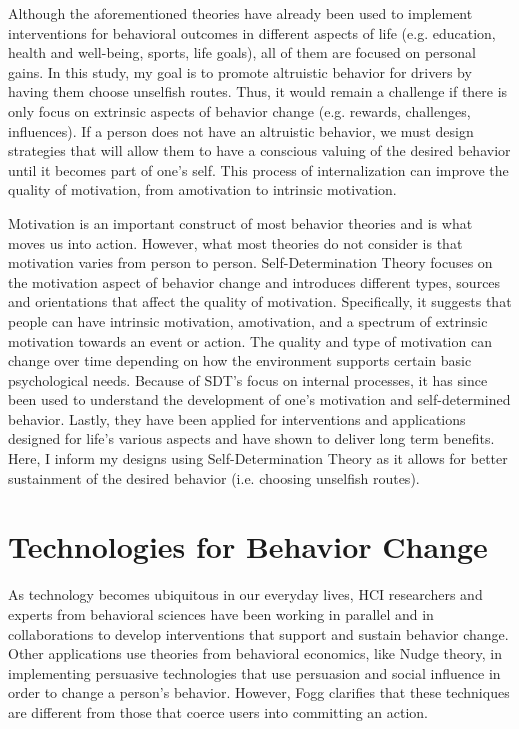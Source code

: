 Although the aforementioned theories have already been used to implement interventions for behavioral outcomes in different aspects of life (e.g. education, health and well-being, sports, life goals), all of them are focused on personal gains. In this study, my goal is to promote altruistic behavior for drivers by having them choose unselfish routes. Thus, it would remain a challenge if there is only focus on extrinsic aspects of behavior change (e.g. rewards, challenges, influences). If a person does not have an altruistic behavior, we must design strategies that will allow them to have a conscious valuing of the desired behavior until it becomes part of one's self. This process of internalization can improve the quality of motivation, from amotivation to intrinsic motivation.

Motivation is an important construct of most behavior theories and is what moves us into action. However, what most theories do not consider is that motivation varies from person to person\cite{ryan2017basic}. Self-Determination Theory focuses on the motivation aspect of behavior change and introduces different types, sources and orientations that affect the quality of motivation\cite{ryan2000intrinsic}. Specifically, it suggests that people can have intrinsic motivation, amotivation, and a spectrum of extrinsic motivation towards an event or action. The quality and type of motivation can change over time depending on how the environment supports certain basic psychological needs. Because of SDT's focus on internal processes, it has since been used to understand the development of one's motivation and self-determined behavior\cite{wehmeyer2017development}. Lastly, they have been applied for interventions and applications designed for life's various aspects and have shown to deliver long term benefits\cite{friederichs2015long}. Here, I inform my designs using Self-Determination Theory as it allows for better sustainment of the desired behavior (i.e. choosing unselfish routes).

\section{Technologies for Behavior Change}
As technology becomes ubiquitous in our everyday lives, HCI researchers and experts from behavioral sciences have been working in parallel and in collaborations to develop interventions that support and sustain behavior change\cite{hekler2013mind}. Other applications use theories from behavioral economics, like Nudge theory\cite{lee2011mining,gunaratne2015informing,caraban201923}, in implementing persuasive technologies\cite{fogg1998persuasive,fogg2002persuasive,fogg2009behavior,kim2012awareness,lee2015understanding,savage2016botivist} that use persuasion and social influence in order to change a person's behavior. However, Fogg clarifies that these techniques are different from those that coerce users into committing an action\cite{fogg2002persuasive}. 

